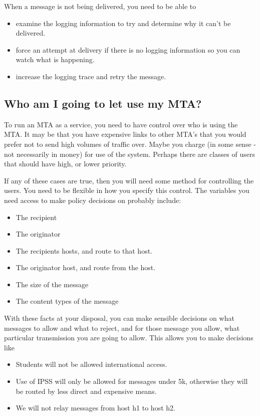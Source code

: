 When a message is not being delivered, you need to be able to
\begin{itemize}
\item	examine the logging information to try and determine why it
can't be delivered.
\item	force an attempt at delivery if there is no logging
information so you can watch what is happening.
\item	increase the logging trace and retry the message.
\end{itemize}	

\subsection{Who am I going to let use my MTA?}
To run an MTA as a service, you need to have control over who is using
the MTA. It may be that you have expensive links to other MTA's that
you would prefer not to send high volumes of traffic over. Maybe you
charge (in some sense - not necessarily in money) for use of the
system. Perhaps there are classes of users that should have high, or
lower priority. 

If any of these cases are true, then you will need some method for
controlling the users. You need to be flexible in how you specify this
control. The variables you need access to make policy decisions on
probably include:
\begin{itemize}
\item	The recipient
\item	The originator
\item	The recipients hosts, and route to that host.
\item	The originator host, and route from the host.
\item	The size of the message
\item	The content types of the message
\end{itemize}

With these facts at your disposal, you can make sensible decisions on
what messages to allow and what to reject, and for those message you
allow, what particular transmission you are going to allow. This
allows you to make decisions like
\begin{itemize}
\item	Students will not be allowed international access.
\item	Use of IPSS will only be allowed for messages under 5k,
otherwise they will be routed by less direct and expensive means.
\item	We will not relay messages from host h1 to host h2.
\end{itemize}

